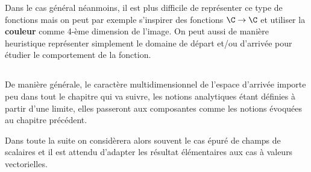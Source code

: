 Dans le cas général néanmoins, il est plus difficile de représenter ce type de fonctions mais on peut par exemple s'inspirer des fonctions \(\C \rightarrow \C\) et utiliser la \textbf{couleur} comme 4-ème dimension de l'image. On peut aussi de manière heuristique représenter simplement le domaine de départ et/ou d'arrivée pour étudier le comportement de la fonction.

\subsection*{}
De manière générale, le caractère multidimensionnel de l'espace d'arrivée importe peu dans tout le chapitre qui va suivre, les notions analytiques étant définies à partir d'une limite, elles passeront aux composantes comme les notions évoquées au chapitre précédent.\<

Dans toute la suite on considèrera alors souvent le cas épuré de champs de scalaires et il est attendu d'adapter les résultat élémentaires aux cas à valeurs vectorielles.

